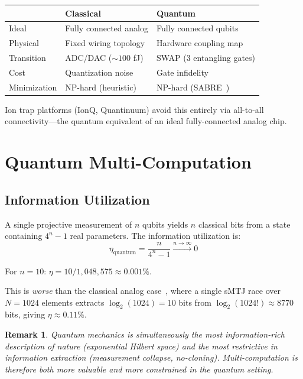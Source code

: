 \documentclass[11pt]{article}
\newtheorem{remark}{Remark}
\begin{document}
\begin{center}
\begin{tabular}{lll}
\toprule
& Classical & Quantum \\
\midrule
Ideal & Fully connected analog & Fully connected qubits \\
Physical & Fixed wiring topology & Hardware coupling map \\
Transition & ADC/DAC (${\sim}100$ fJ) & SWAP (3 entangling gates) \\
Cost & Quantization noise & Gate infidelity \\
Minimization & NP-hard (heuristic) & NP-hard (SABRE~\cite{sabre}) \\
\bottomrule
\end{tabular}
\end{center}

Ion trap platforms (IonQ, Quantinuum) avoid this entirely via all-to-all connectivity---the quantum equivalent of an ideal fully-connected analog chip.

\section{Quantum Multi-Computation}
\label{sec:multicomp}

\subsection{Information Utilization}

A single projective measurement of $n$ qubits yields $n$ classical bits from a state containing $4^n - 1$ real parameters. The information utilization is:
\begin{equation}
\eta_{\text{quantum}} = \frac{n}{4^n - 1} \xrightarrow{n \to \infty} 0
\end{equation}

For $n = 10$: $\eta = 10 / 1{,}048{,}575 \approx 0.001\%$.

This is \textit{worse} than the classical analog case~\cite{bieg_multi}, where a single sMTJ race over $N = 1024$ elements extracts $\log_2(1024) = 10$ bits from $\log_2(1024!) \approx 8770$ bits, giving $\eta \approx 0.11\%$.

\begin{remark}
Quantum mechanics is simultaneously the most information-rich description of nature (exponential Hilbert space) and the most restrictive in information extraction (measurement collapse, no-cloning). Multi-computation is therefore both more valuable and more constrained in the quantum setting.
\end{remark}
\end{document}
